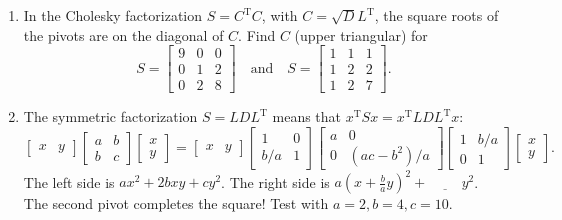 \documentclass[14pt, a4paper]{article}
\begin{document}
\begin{enumerate}[resume]
    \item In the Cholesky factorization $S = C^{\mathrm{T}}C$, with $C = \sqrt{D}L^{\mathrm{T}}$, the square roots of the pivots are on the diagonal of $C$. Find $C$ (upper triangular) for
          \[
              S = \begin{bmatrix} 9 & 0 & 0 \\ 0 & 1 & 2 \\ 0 & 2 & 8 \end{bmatrix} \quad \text{and} \quad S = \begin{bmatrix} 1 & 1 & 1 \\ 1 & 2 & 2 \\ 1 & 2 & 7 \end{bmatrix}.
          \]

    \item The symmetric factorization $S = LDL^{\mathrm{T}}$ means that $x^{\mathrm{T}}Sx = x^{\mathrm{T}}LDL^{\mathrm{T}}x$:
          \[
              \begin{bmatrix} x & y \end{bmatrix} \begin{bmatrix} a & b \\ b & c \end{bmatrix} \begin{bmatrix} x \\ y \end{bmatrix} = \begin{bmatrix} x & y \end{bmatrix} \begin{bmatrix} 1 & 0 \\ b/a & 1 \end{bmatrix} \begin{bmatrix} a & 0 \\ 0 & (ac - b^2)/a \end{bmatrix} \begin{bmatrix} 1 & b/a \\ 0 & 1 \end{bmatrix} \begin{bmatrix} x \\ y \end{bmatrix}.
          \]
          The left side is $ax^2 + 2bxy + cy^2$. The right side is $a(x + \frac{b}{a}y)^2 + \underline{\hspace{1cm}}y^2$. The second pivot completes the square! Test with $a = 2, b = 4, c = 10$.


\end{enumerate}
\end{document}
